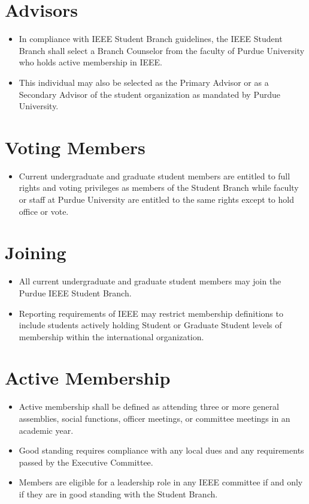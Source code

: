 \documentclass[12pt]{constitution}
\begin{document}
\section{Advisors}
\label{sec:mem_advis}
\begin{itemize}
    \item In compliance with IEEE Student Branch guidelines, the IEEE Student Branch shall select a Branch Counselor from the faculty of Purdue University who holds active membership in IEEE.
    \item This individual may also be selected as the Primary Advisor or as a Secondary Advisor of the student organization as mandated by Purdue University.
\end{itemize}

\section{Voting Members}
\label{sec:mem_vot}
\begin{itemize}
    \item Current undergraduate and graduate student members are entitled to full rights and voting privileges as members of the Student Branch while faculty or staff at Purdue University are entitled to the same rights except to hold office or vote.
\end{itemize}

\section{Joining}
\label{sec:mem_join}
\begin{itemize}
    \item All current undergraduate and graduate student members may join the Purdue IEEE Student Branch.
    \item Reporting requirements of IEEE may restrict membership definitions to include students actively holding Student or Graduate Student levels of membership within the international organization.
\end{itemize}

\section{Active Membership}
\label{sec:mem_active}
\begin{itemize}
    \item Active membership shall be defined as attending three or more general assemblies, social functions, officer meetings, or committee meetings in an academic year.
    \item Good standing requires compliance with any local dues and any requirements passed by the Executive Committee.
    \item Members are eligible for a leadership role in any IEEE committee if and only if they are in good standing with the Student Branch.
\end{itemize}
\end{document}
